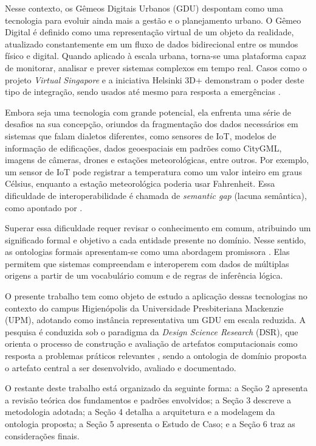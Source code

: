 \documentclass[
  article,   %
  11pt,      %
  oneside,   %
  a4paper,   %
  english,   %
  brazil,    %
  sumario=tradicional
]{abntex2}
\newcommand{\en}[1]{\foreignlanguage{english}{\textit{#1}}}
\begin{document}
Nesse contexto, os Gêmeos Digitais Urbanos (GDU) despontam como uma tecnologia para evoluir ainda
mais a gestão e o planejamento urbano.
O Gêmeo Digital é definido como uma representação virtual de um objeto da realidade, atualizado
constantemente em um fluxo de dados bidirecional entre os mundos físico e digital.
Quando aplicado à escala urbana, torna-se uma plataforma capaz de monitorar, analisar e prever
sistemas complexos em tempo real.
Casos como o projeto \en{Virtual Singapore} e a iniciativa Helsinki 3D+ demonstram o poder deste
tipo de integração, sendo usados até mesmo para resposta a emergências
\cite{FERREBIGORRA2022103905, WEIL2023104862}.

Embora seja uma tecnologia com grande potencial, ela enfrenta uma série de desafios na sua
concepção, oriundos da fragmentação dos dados necessários em sistemas que falam dialetos
diferentes, como sensores de IoT, modelos de informação de edificações, dados geoespaciais em
padrões como CityGML, imagens de câmeras, drones e estações meteorológicas, entre outros.
Por exemplo, um sensor de IoT pode registrar a temperatura como um valor inteiro em graus Célsius,
enquanto a estação meteorológica poderia usar Fahrenheit.
Essa dificuldade de interoperabilidade é chamada de \en{semantic gap} (lacuna semântica), como
apontado por .

Superar essa dificuldade requer revisar o conhecimento em comum, atribuindo um significado formal e
objetivo a cada entidade presente no domínio.
Nesse sentido, as ontologias formais apresentam-se como uma abordagem promissora
\cite{metral_ontologybased_2010}.
Elas permitem que sistemas compreendam e interoperem com dados de múltiplas origens a partir de um
vocabulário comum e de regras de inferência lógica.

O presente trabalho tem como objeto de estudo a aplicação dessas tecnologias no contexto do campus
Higienópolis da Universidade Presbiteriana Mackenzie (UPM), adotando como instância representativa
um GDU em escala reduzida.
A pesquisa é conduzida sob o paradigma da \en{Design Science Research} (DSR), que orienta o
processo de construção e avaliação de artefatos computacionais como resposta a problemas práticos
relevantes \cite{hevner_2004}, sendo a ontologia de domínio proposta o artefato central a ser
desenvolvido, avaliado e documentado.

O restante deste trabalho está organizado da seguinte forma: a Seção 2 apresenta a revisão teórica
dos fundamentos e padrões envolvidos; a Seção 3 descreve a metodologia adotada; a Seção 4 detalha a
arquitetura e a modelagem da ontologia proposta; a Seção 5 apresenta o Estudo de Caso; e a Seção 6
traz as considerações finais.
\end{document}
